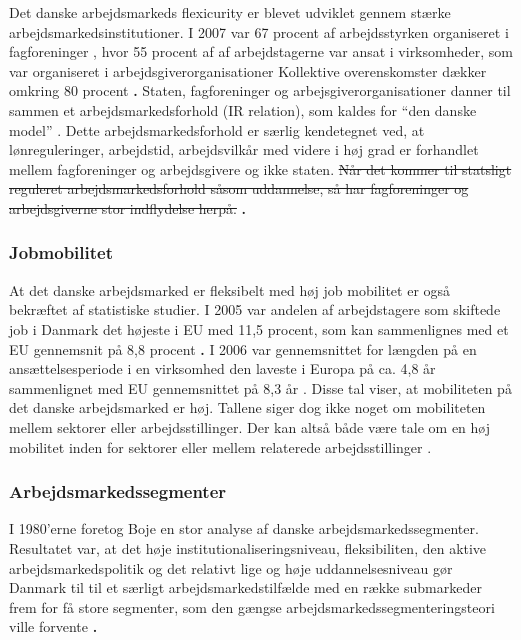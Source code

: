 Det danske arbejdsmarkeds flexicurity er blevet udviklet gennem stærke arbejdsmarkedsinstitutioner. I 2007 var 67 procent af arbejdsstyrken organiseret i fagforeninger \parencite[11]{Touboel2013}, hvor 55 procent af af arbejdstagerne var ansat i virksomheder, som var organiseret i arbejdsgiverorganisationer \textbf{\parencite[11]{Touboel2013}} %
Kollektive overenskomster dækker omkring 80 procent \textbf{\parencite[11]{Touboel2013}.} %
Staten, fagforeninger og arbejsgiverorganisationer danner til sammen et arbejdsmarkedsforhold (IR relation), som kaldes for “den danske model” \textbf{\parencite[11]{Touboel2013}}. %
Dette arbejdsmarkedsforhold er særlig kendetegnet ved, at lønreguleringer, arbejdstid, arbejdsvilkår med videre i høj grad er forhandlet mellem fagforeninger og arbejdsgivere og ikke staten. \sout{Når det kommer til statsligt reguleret arbejdsmarkedsforhold såsom uddannelse, så har fagforeninger og arbejdsgiverne stor indflydelse herpå.} \textbf{\parencite[11]{Touboel2013}.}


\subsubsection{Jobmobilitet}

At det danske arbejdsmarked er fleksibelt med høj job mobilitet er også bekræftet af statistiske studier. I 2005 var andelen af arbejdstagere som skiftede job i Danmark det højeste i EU med 11,5 procent, som kan sammenlignes med et EU gennemsnit på 8,8 procent \textbf{\parencite[21]{Andersen2008}.} %
I 2006 var gennemsnittet for længden på en ansættelsesperiode i en virksomhed den laveste i Europa på ca. 4,8 år sammenlignet med EU gennemsnittet på 8,3 år \textbf{\parencite[27]{Andersen2008}}. %
Disse tal viser, at mobiliteten på det danske arbejdsmarked er høj. Tallene siger dog ikke noget om mobiliteten mellem sektorer eller arbejdsstillinger. Der kan altså både være tale om en høj mobilitet inden for sektorer eller mellem relaterede arbejdsstillinger \parencite[11]{Touboel2013}.


\subsubsection{Arbejdsmarkedssegmenter}

I 1980'erne foretog Boje en stor analyse af danske arbejdsmarkedssegmenter. Resultatet var, at det høje institutionaliseringsniveau, fleksibiliten, den aktive arbejdsmarkedspolitik og det relativt lige og høje uddannelsesniveau gør Danmark til til et særligt arbejdsmarkedstilfælde med en række submarkeder frem for få store segmenter, som den gængse arbejdsmarkedssegmenteringsteori ville forvente \textbf{\parencite{Boje1986}.} %


